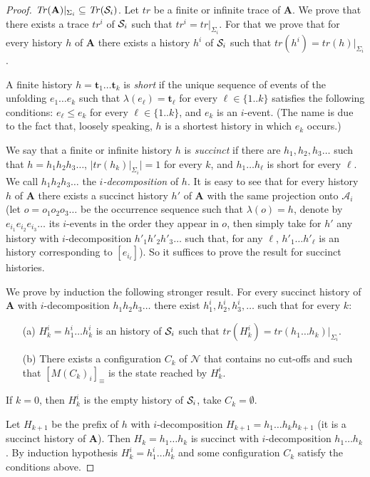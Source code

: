 \documentclass{llncs}
\def\A{\mathcal{A}}
\def\prod{\mathbf{A}}
\def\t{\mathbf{t}}
\def\N{\mathcal{N}}
\def\S{\mathcal{S}}
\newcommand{\ma}[1]{M(#1)}
\newcommand{\Tr}[1]{{\it Tr}(#1)}
\renewcommand{\S}{{\cal S}}
\def\trace{tr}
\begin{document}
\begin{proof}
$\Tr{\prod}|_{\Sigma_i} \subseteq \Tr{\S_i}$.  Let $\trace$ be a finite or infinite trace of $\prod$.
We prove that there exists a trace $\trace^i$ of $\S_i$ such that $\trace^i=\trace|_{\Sigma_i}$.
For that we prove that for every history $h$ of $\prod$ there exists a history $h^i$ of $\S_i$ 
such that $\trace(h^i)=\trace(h)|_{\Sigma_i}$. 

A finite history $h=\t_1 \ldots \t_k$ is {\em short} if the unique sequence of events of the unfolding
$e_1 \ldots e_k$ such that $\lambda(e_\ell)=\t_\ell$ for every $\ell \in \{1..k\}$ satisfies the
following conditions: $e_\ell \leq e_k$ for every $\ell \in \{1..k\}$, and $e_k$ is an $i$-event.
(The name is due to the fact that, loosely speaking, $h$ is a shortest history in which $e_k$ occurs.)  

We say that a finite or infinite history $h$ is {\em succinct} if there are $h_1,h_2,h_3 \ldots$ such that 
$h = h_1h_2h_3 \ldots$, $|\trace(h_k)|_{\Sigma_i}|=1$ for every $k$, and $h_1 \ldots h_\ell$ is short for every $\ell$.
We call $h_1 h_2 h_3\dots$ the {\em $i$-decomposition} of $h$.
It is easy to see that for every history $h$ of $\prod$ there exists a succinct history $h'$ of $\prod$ with the same 
projection onto $\A_i$ (let $o=o_1o_2o_3\dots$ be the occurrence sequence such that $\lambda(o)=h$, denote by $e_{i_1}e_{i_2}e_{i_3}\dots$ its $i$-events in the order they appear in $o$, then simply take for $h'$ any history with $i$-decomposition $h'_1h'_2h'_3\dots$ such that, for any $\ell$, $h'_1\dots h'_\ell$ is an history corresponding to $[e_{i_\ell}]$).
So it suffices to prove the result for 
succinct histories. 

We prove by induction the following stronger result.
For every succinct history of $\prod$ with $i$-decomposition $h_1h_2h_3 \ldots$ there exist $h_1^i,h_2^i,h_3^i,\dots$ such that for every $k$:
\begin{enumerate}
\item[(a)] $H^i_k=h^i_1\dots h^i_k$ is an history of $\S_i$ such that $\trace(H^i_k)=\trace(h_1\dots h_k)|_{\Sigma_i}$.
\item[(b)] There exists a configuration $C_k$ of $\N$ that contains no cut-offs and such that
$[\ma{C_k}_i]_\equiv$ is the state reached by $H^i_k$.
\end{enumerate}

If $k=0$, then $H^i_k$ is the empty history of $\S_i$, take $C_k = \emptyset$.

Let $H_{k+1}$ be the prefix of $h$ with $i$-decomposition $H_{k+1}=h_1 \ldots h_k h_{k+1}$ (it is a succinct history of $\prod$).
Then $H_k = h_1 \ldots h_k$ is succinct with $i$-decomposition $h_1 \ldots h_k$. 
By induction hypothesis $H_k^i=h_1^i\dots h_k^i$ and some configuration $C_k$
satisfy the conditions above. 


\end{proof}
\end{document}
